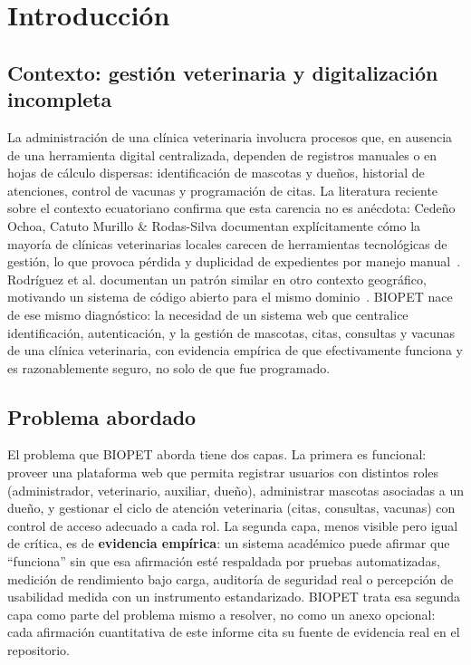\chapter{Introducci\'on}
\label{cap:introduccion}

\section{Contexto: gesti\'on veterinaria y digitalizaci\'on incompleta}

La administraci\'on de una cl\'inica veterinaria involucra procesos que, en
ausencia de una herramienta digital centralizada, dependen de registros
manuales o en hojas de c\'alculo dispersas: identificaci\'on de mascotas y
due\~nos, historial de atenciones, control de vacunas y programaci\'on de
citas. La literatura reciente sobre el contexto ecuatoriano confirma que
esta carencia no es an\'ecdota: Cede\~no Ochoa, Catuto Murillo \& Rodas-Silva
documentan expl\'icitamente c\'omo la mayor\'ia de cl\'inicas veterinarias
locales carecen de herramientas tecnol\'ogicas de gesti\'on, lo que provoca
p\'erdida y duplicidad de expedientes por manejo manual~\cite{cedeno2021veterinaria}.
Rodr\'iguez et al. documentan un patr\'on similar en otro contexto
geogr\'afico, motivando un sistema de c\'odigo abierto para el mismo
dominio~\cite{rodriguez2024oscrum}. BIOPET nace de ese mismo diagn\'ostico:
la necesidad de un sistema web que centralice identificaci\'on,
autenticaci\'on, y la gesti\'on de mascotas, citas, consultas y vacunas de
una cl\'inica veterinaria, con evidencia emp\'irica de que efectivamente
funciona y es razonablemente seguro, no solo de que fue programado.

\section{Problema abordado}

El problema que BIOPET aborda tiene dos capas. La primera es funcional:
proveer una plataforma web que permita registrar usuarios con distintos
roles (administrador, veterinario, auxiliar, due\~no), administrar mascotas
asociadas a un due\~no, y gestionar el ciclo de atenci\'on veterinaria
(citas, consultas, vacunas) con control de acceso adecuado a cada rol. La
segunda capa, menos visible pero igual de cr\'itica, es de \textbf{evidencia
emp\'irica}: un sistema acad\'emico puede afirmar que ``funciona'' sin que
esa afirmaci\'on est\'e respaldada por pruebas automatizadas, medici\'on de
rendimiento bajo carga, auditor\'ia de seguridad real o percepci\'on de
usabilidad medida con un instrumento estandarizado. BIOPET trata esa
segunda capa como parte del problema mismo a resolver, no como un anexo
opcional: cada afirmaci\'on cuantitativa de este informe cita su fuente de
evidencia real en el repositorio.

